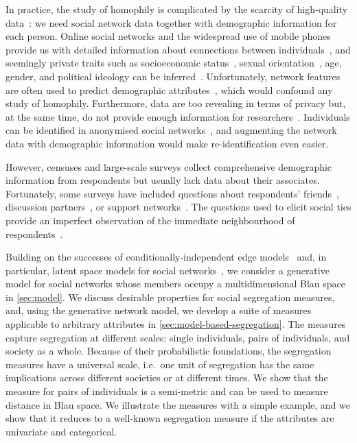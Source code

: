 \documentclass{scrartcl}
\begin{document}
In practice, the study of homophily is complicated by the scarcity of high-quality data~\cite{Butts2012, Blumenstock2013}: we need social network data together with demographic information for each person. Online social networks and the widespread use of mobile phones provide us with detailed information about connections between individuals~\cite{Golder2014}, and seemingly private traits such as socioeconomic status~\cite{Blumenstock2015, Luo2017}, sexual orientation~\cite{Wang2017}, age, gender, and political ideology can be inferred~\cite{Kosinski2013}. Unfortunately, network features are often used to predict demographic attributes~\cite{Wang2013,Blumenstock2015,Luo2017,Kosinski2013}, which would confound any study of homophily. %
Furthermore, data are too revealing in terms of privacy but, at the same time, do not provide enough information for researchers~\cite{Golder2014}. Individuals can be identified in anonymised social networks~\cite{Backstrom2011, Narayanan2008}, and augmenting the network data with demographic information would make re-identification even easier.

However, censuses and large-scale surveys collect comprehensive demographic information from respondents but usually lack data about their associates. Fortunately, some surveys have included questions about respondents' friends~\cite{Huckfeldt1983, Johnson1989}, discussion partners~\cite{Marsden1987, McPherson2006}, or support networks~\cite{Kalmijn2007, Banerjee2013}. The questions used to elicit social ties provide an imperfect observation of the immediate neighbourhood of respondents~\cite{Marin2004,Eagle2015,Eveland-Jr.2017}.

Building on the successes of conditionally-independent edge models~\cite{Snijders2011} and, in particular, latent space models for social networks~\cite{Hoff2002,Handcock2007,Raftery2012}, we consider a generative model for social networks whose members occupy a multidimensional Blau space in \cref{sec:model}. We discuss desirable properties for social segregation measures, and, using the generative network model, we develop a suite of measures applicable to arbitrary attributes in \cref{sec:model-based-segregation}. The measures capture segregation at different scales: single individuals, pairs of individuals, and society as a whole. Because of their probabilistic foundations, the segregation measures have a universal scale, i.e.\ one unit of segregation has the same implications across different societies or at different times. We show that the measure for pairs of individuals is a semi-metric and can be used to measure distance in Blau space. We illustrate the measures with a simple example, and we show that it reduces to a well-known segregation measure if the attributes are univariate and categorical.
\end{document}
